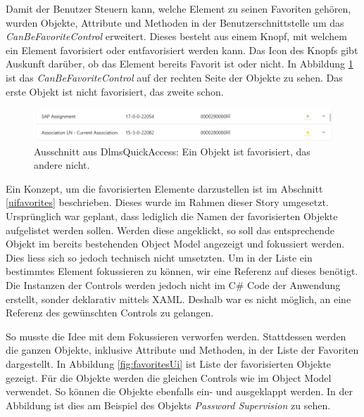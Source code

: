 Damit der Benutzer Steuern kann, welche Element zu seinen Favoriten gehören, wurden Objekte, Attribute und Methoden in der Benutzerschnittstelle um das \textit{CanBeFavoriteControl} erweitert.
Dieses besteht aus einem Knopf, mit welchem ein Element favorisiert oder entfavorisiert werden kann.
Das Icon des Knopfs gibt Auskunft darüber, ob das Element bereits Favorit ist oder nicht.
In Abbildung \ref{fig:objectModelWithFavorites} ist das \textit{CanBeFavoriteControl} auf der rechten Seite der Objekte zu sehen.
Das erste Objekt ist nicht favorisiert, das zweite schon.

\begin{figure}
   \centering
   \includegraphics[width=1.0\textwidth]{gfx/objectModelWithFavorites.png}
   \caption{
      Ausschnitt aus DlmsQuickAccess: Ein Objekt ist favorisiert, das andere nicht.
      }
   \label{fig:objectModelWithFavorites}
\end{figure}

Ein Konzept, um die favorisierten Elemente darzustellen ist im Abschnitt \ref{uifavorites} beschrieben.
Dieses wurde im Rahmen dieser Story umgesetzt.
Ursprünglich war geplant, dass lediglich die Namen der favorisierten Objekte aufgelistet werden sollen.
Werden diese angeklickt, so soll das entsprechende Objekt im bereits bestehenden Object Model angezeigt und fokussiert werden.
Dies liess sich so jedoch technisch nicht umsetzten.
Um in der Liste ein bestimmtes Element fokussieren zu können, wir eine Referenz auf dieses benötigt.
Die Instanzen der Controls werden jedoch nicht im C\# Code der Anwendung erstellt, sonder deklarativ mittels XAML.
Deshalb war es nicht möglich, an eine Referenz des gewünschten Controls zu gelangen.

So musste die Idee mit dem Fokussieren verworfen werden.
Stattdessen werden die ganzen Objekte, inklusive Attribute und Methoden, in der Liste der Favoriten dargestellt.
In Abbildung \ref{fig:favoritesUi} ist Liste der favorisierten Objekte gezeigt.
Für die Objekte werden die gleichen Controls wie im Object Model verwendet.
So können die Objekte ebenfalls ein- und ausgeklappt werden.
In der Abbildung ist dies am Beispiel des Objekts \textit{Password Supervision} zu sehen.

